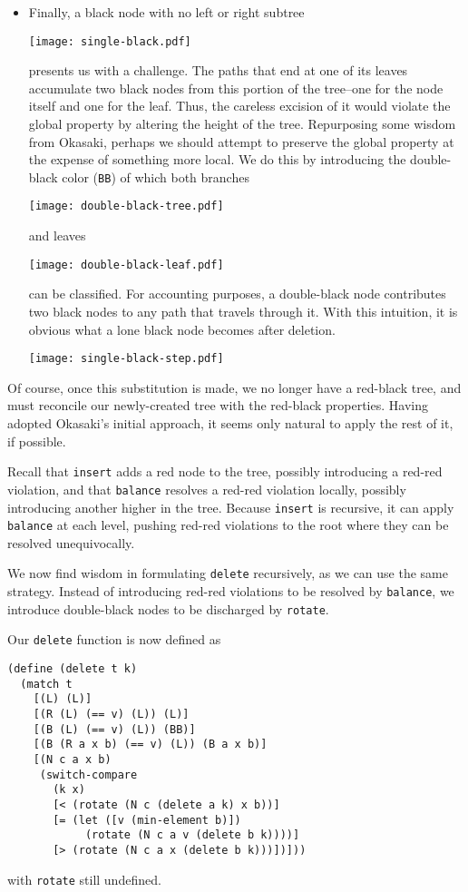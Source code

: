 \documentclass[preprint]{sigplanconf}
\begin{document}
\begin{itemize}
\item Finally, a black node with no left or right subtree
\begin{center}
\texttt{[image: single-black.pdf]}
\end{center}
presents us with a challenge. The paths that end at one of its leaves accumulate two black nodes from this portion of the tree--one for the node itself and one for the leaf. Thus, the careless excision of it would violate the global property by altering the height of the tree. Repurposing some wisdom from Okasaki, perhaps we should attempt to preserve the global property at the expense of something more local. We do this by introducing the double-black color (\texttt{BB}) of which both branches
\begin{center}
\texttt{[image: double-black-tree.pdf]}
\end{center}
and leaves
\begin{center}
\texttt{[image: double-black-leaf.pdf]}
\end{center}
can be classified. For accounting purposes, a double-black node contributes two black nodes to any path that travels through it. With this intuition, it is obvious what a lone black node becomes after deletion. 
\begin{center}
\texttt{[image: single-black-step.pdf]}
\end{center}

\end{itemize}

Of course, once this substitution is made, we no longer have a red-black tree, and must reconcile our newly-created tree with the red-black properties. Having adopted Okasaki's initial approach, it seems only natural to apply the rest of it, if possible.

Recall that \texttt{insert} adds a red node to the tree, possibly introducing a red-red violation, and that \texttt{balance} resolves a red-red violation locally, possibly introducing another higher in the tree. Because \texttt{insert} is recursive, it can apply \texttt{balance} at each level, pushing red-red violations to the root where they can be resolved unequivocally.

We now find wisdom in formulating \texttt{delete} recursively, as we can use the same strategy. Instead of introducing red-red violations to be resolved by \texttt{balance}, we introduce double-black nodes to be discharged by \texttt{rotate}.

Our \texttt{delete} function is now defined as
\begin{verbatim}
(define (delete t k)
  (match t
    [(L) (L)]
    [(R (L) (== v) (L)) (L)]
    [(B (L) (== v) (L)) (BB)]
    [(B (R a x b) (== v) (L)) (B a x b)]
    [(N c a x b)
     (switch-compare
       (k x)
       [< (rotate (N c (delete a k) x b))]
       [= (let ([v (min-element b)])
            (rotate (N c a v (delete b k))))]
       [> (rotate (N c a x (delete b k)))])]))
\end{verbatim}
with \texttt{rotate} still undefined.
\end{document}
